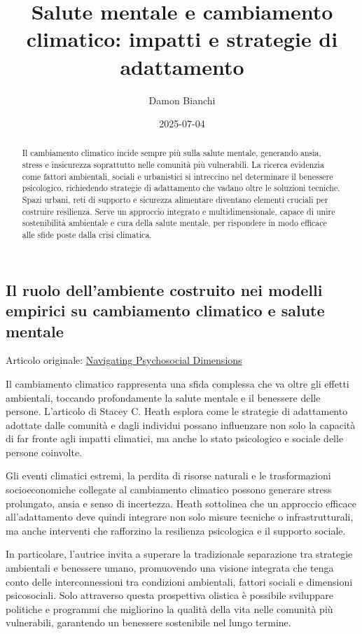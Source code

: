 \documentclass[
]{article}
\title{Salute mentale e cambiamento climatico: impatti e strategie di
adattamento}
\author{Damon Bianchi}
\date{2025-07-04}
\begin{document}
\maketitle
\begin{abstract}
Il cambiamento climatico incide sempre più sulla salute mentale,
generando ansia, stress e insicurezza soprattutto nelle comunità più
vulnerabili. La ricerca evidenzia come fattori ambientali, sociali e
urbanistici si intreccino nel determinare il benessere psicologico,
richiedendo strategie di adattamento che vadano oltre le soluzioni
tecniche. Spazi urbani, reti di supporto e sicurezza alimentare
diventano elementi cruciali per costruire resilienza. Serve un approccio
integrato e multidimensionale, capace di unire sostenibilità ambientale
e cura della salute mentale, per rispondere in modo efficace alle sfide
poste dalla crisi climatica.
\end{abstract}

\subsection{Il ruolo dell'ambiente costruito nei modelli empirici su
cambiamento climatico e salute
mentale}\label{il-ruolo-dellambiente-costruito-nei-modelli-empirici-su-cambiamento-climatico-e-salute-mentale}

Articolo originale:
\href{https://www.sciencedirect.com/science/article/pii/S1877343524000800}{Navigating
Psychosocial Dimensions}

Il cambiamento climatico rappresenta una sfida complessa che va oltre
gli effetti ambientali, toccando profondamente la salute mentale e il
benessere delle persone. L'articolo di Stacey C. Heath esplora come le
strategie di adattamento adottate dalle comunità e dagli individui
possano influenzare non solo la capacità di far fronte agli impatti
climatici, ma anche lo stato psicologico e sociale delle persone
coinvolte.

Gli eventi climatici estremi, la perdita di risorse naturali e le
trasformazioni socioeconomiche collegate al cambiamento climatico
possono generare stress prolungato, ansia e senso di incertezza. Heath
sottolinea che un approccio efficace all'adattamento deve quindi
integrare non solo misure tecniche o infrastrutturali, ma anche
interventi che rafforzino la resilienza psicologica e il supporto
sociale.

In particolare, l'autrice invita a superare la tradizionale separazione
tra strategie ambientali e benessere umano, promuovendo una visione
integrata che tenga conto delle interconnessioni tra condizioni
ambientali, fattori sociali e dimensioni psicosociali. Solo attraverso
questa prospettiva olistica è possibile sviluppare politiche e programmi
che migliorino la qualità della vita nelle comunità più vulnerabili,
garantendo un benessere sostenibile nel lungo termine.
\end{document}
